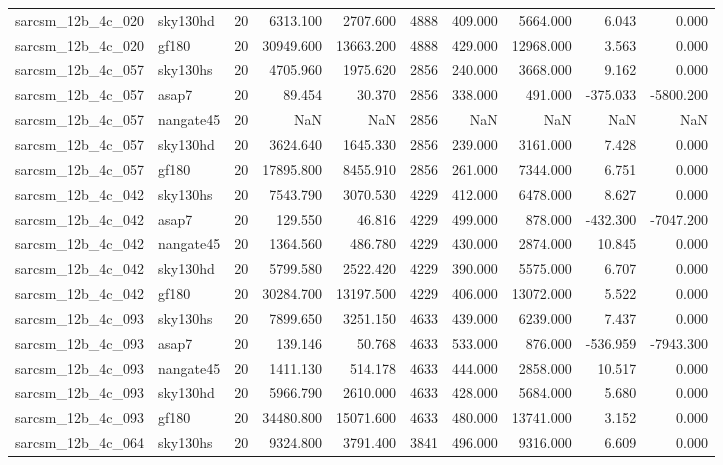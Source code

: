 \begin{tabular}{llrrrrrrrr}
sarcsm\_12b\_4c\_020 & sky130hd & 20 & 6313.100 & 2707.600 & 4888 & 409.000 & 5664.000 & 6.043 & 0.000 \\
sarcsm\_12b\_4c\_020 & gf180 & 20 & 30949.600 & 13663.200 & 4888 & 429.000 & 12968.000 & 3.563 & 0.000 \\
sarcsm\_12b\_4c\_057 & sky130hs & 20 & 4705.960 & 1975.620 & 2856 & 240.000 & 3668.000 & 9.162 & 0.000 \\
sarcsm\_12b\_4c\_057 & asap7 & 20 & 89.454 & 30.370 & 2856 & 338.000 & 491.000 & -375.033 & -5800.200 \\
sarcsm\_12b\_4c\_057 & nangate45 & 20 & NaN & NaN & 2856 & NaN & NaN & NaN & NaN \\
sarcsm\_12b\_4c\_057 & sky130hd & 20 & 3624.640 & 1645.330 & 2856 & 239.000 & 3161.000 & 7.428 & 0.000 \\
sarcsm\_12b\_4c\_057 & gf180 & 20 & 17895.800 & 8455.910 & 2856 & 261.000 & 7344.000 & 6.751 & 0.000 \\
sarcsm\_12b\_4c\_042 & sky130hs & 20 & 7543.790 & 3070.530 & 4229 & 412.000 & 6478.000 & 8.627 & 0.000 \\
sarcsm\_12b\_4c\_042 & asap7 & 20 & 129.550 & 46.816 & 4229 & 499.000 & 878.000 & -432.300 & -7047.200 \\
sarcsm\_12b\_4c\_042 & nangate45 & 20 & 1364.560 & 486.780 & 4229 & 430.000 & 2874.000 & 10.845 & 0.000 \\
sarcsm\_12b\_4c\_042 & sky130hd & 20 & 5799.580 & 2522.420 & 4229 & 390.000 & 5575.000 & 6.707 & 0.000 \\
sarcsm\_12b\_4c\_042 & gf180 & 20 & 30284.700 & 13197.500 & 4229 & 406.000 & 13072.000 & 5.522 & 0.000 \\
sarcsm\_12b\_4c\_093 & sky130hs & 20 & 7899.650 & 3251.150 & 4633 & 439.000 & 6239.000 & 7.437 & 0.000 \\
sarcsm\_12b\_4c\_093 & asap7 & 20 & 139.146 & 50.768 & 4633 & 533.000 & 876.000 & -536.959 & -7943.300 \\
sarcsm\_12b\_4c\_093 & nangate45 & 20 & 1411.130 & 514.178 & 4633 & 444.000 & 2858.000 & 10.517 & 0.000 \\
sarcsm\_12b\_4c\_093 & sky130hd & 20 & 5966.790 & 2610.000 & 4633 & 428.000 & 5684.000 & 5.680 & 0.000 \\
sarcsm\_12b\_4c\_093 & gf180 & 20 & 34480.800 & 15071.600 & 4633 & 480.000 & 13741.000 & 3.152 & 0.000 \\
sarcsm\_12b\_4c\_064 & sky130hs & 20 & 9324.800 & 3791.400 & 3841 & 496.000 & 9316.000 & 6.609 & 0.000 \\

\end{tabular}
